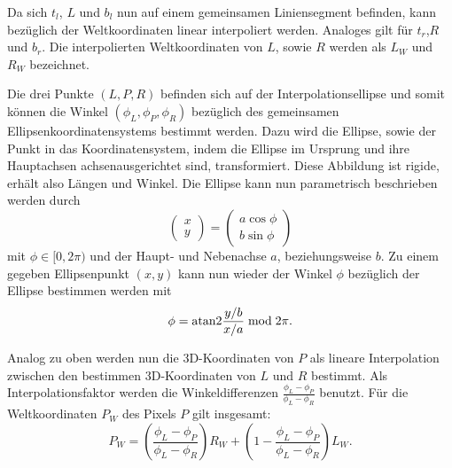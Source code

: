 Da sich $t_l$, $L$ und $b_l$ nun auf einem gemeinsamen Liniensegment befinden, kann bezüglich der Weltkoordinaten linear interpoliert werden. Analoges gilt für $t_r$,$R$ und $b_r$.
Die interpolierten Weltkoordinaten von $L$, sowie $R$ werden als $L_W$ und $R_W$ bezeichnet.

Die drei Punkte $(L, P, R)$ befinden sich auf der Interpolationsellipse und somit können die  Winkel $(\phi_L, \phi_P, \phi_R)$ bezüglich des gemeinsamen Ellipsenkoordinatensystems bestimmt werden. Dazu wird die Ellipse, sowie der Punkt in das Koordinatensystem, indem die Ellipse im Ursprung und ihre Hauptachsen achsenausgerichtet sind, transformiert. Diese Abbildung ist rigide, erhält also Längen und Winkel. Die Ellipse kann nun parametrisch beschrieben werden durch
\[
\begin{pmatrix}x \\ y\end{pmatrix} = \begin{pmatrix}a\cos\phi \\
b\sin\phi\end{pmatrix}
\] %
mit $\phi \in [0, 2\pi)$ und der Haupt- und Nebenachse $a$, beziehungsweise $b$. Zu einem gegeben Ellipsenpunkt $(x,y)$ kann nun wieder der Winkel $\phi$ bezüglich der Ellipse bestimmen werden mit
\[
\phi = \text{atan2} \frac{y/b}{x/a} \bmod 2\pi.
\] %

Analog zu oben werden nun die 3D-Koordinaten von $P$ als lineare Interpolation zwischen den bestimmen 3D-Koordinaten von $L$ und $R$ bestimmt. Als Interpolationsfaktor werden die Winkeldifferenzen
$\frac{\phi_L - \phi_P}{\phi_L - \phi_R}$ benutzt. Für die Weltkoordinaten $P_W$ des Pixels $P$ gilt insgesamt:
\[
P_W = \left(\frac{\phi_L - \phi_P}{\phi_L - \phi_R}\right) R_W + \left(1 - \frac{\phi_L - \phi_P}{\phi_L - \phi_R}\right) L_W.
\]

